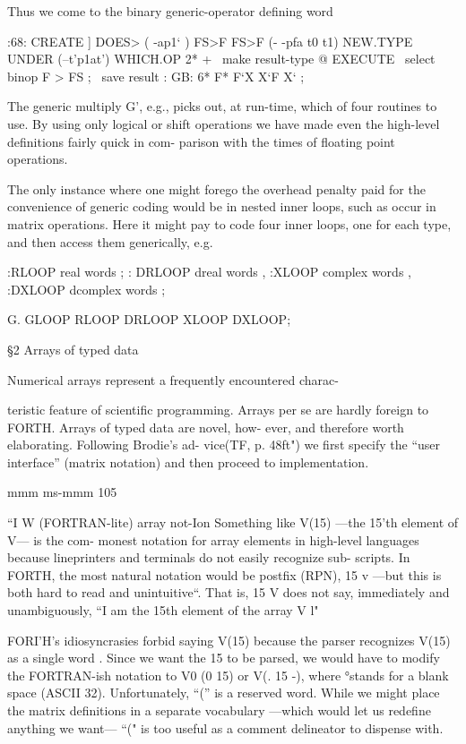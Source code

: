 Thus we come to the binary generic-operator defining word

:68: CREATE ] DOES> ( -ap1‘ )
FS>F FS>F (- -pfa t0 t1)
NEW.TYPE UNDER (--t’p1at')
WHICH.OP 2* + \ make result-type
@ EXECUTE \ select binop
F > FS ; \ save result
\say: GB: 6* F* F‘X X‘F X‘ ;

The generic multiply G', e.g., picks out, at run-time, which of
four routines to use. By using only logical or shift operations we
have made even the high-level definitions fairly quick in com-
parison with the times of floating point operations.

The only instance where one might forego the overhead penalty
paid for the convenience of generic coding would be in nested
inner loops, such as occur in matrix operations. Here it might pay
to code four inner loops, one for each type, and then access them
generically, e.g.

:RLOOP real words ;
: DRLOOP dreal words ,
:XLOOP complex words ,
:DXLOOP dcomplex words ;

G. GLOOP RLOOP DRLOOP XLOOP DXLOOP;

§2 Arrays of typed data

Numerical arrays represent a frequently encountered charac-

teristic feature of scientific programming. Arrays per se are
hardly foreign to FORTH. Arrays of typed data are novel, how-
ever, and therefore worth elaborating. Following Brodie’s ad-
vice(TF, p. 48ft") we first specify the “user interface” (matrix
notation) and then proceed to implementation.

mmm ms-mmm 105

“I W (FORTRAN-lite) array not-Ion
Something like V(15) —the 15'th element of V— is the com-
monest notation for array elements in high-level languages
because lineprinters and terminals do not easily recognize sub-
scripts. In FORTH, the most natural notation would be postfix
(RPN), 15 v —but this is both hard to read and unintuitive“.
That is, 15 V does not say, immediately and unambiguously,
“I am the 15th element of the array V l"

FORI'H's idiosyncrasies forbid saying V(15) because the parser
recognizes V(15) as a single word . Since we want the 15 to be
parsed, we would have to modify the FORTRAN-ish notation to
V0 (0 15) or V(. 15 -), where °stands for a blank space (ASCII 32).
Unfortunately, “(” is a reserved word. While we might place the
matrix definitions in a separate vocabulary —which would let us
redefine anything we want— “(" is too useful as a comment
delineator to dispense with.

